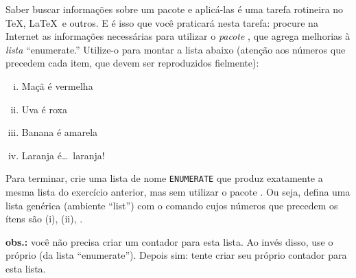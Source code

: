 \documentclass[a4paper,10pt,twocolumn,landscape]{article}
\begin{document}
	\begin{exercicio}
	Saber buscar informações sobre um pacote e aplicá-las é uma tarefa rotineira
	no \TeX, \LaTeX\ e outros. E é isso que você praticará nesta tarefa: procure 
	na Internet as informações necessárias para utilizar o \emph{pacote}
	, que agrega melhorias à \emph{lista} ``enumerate.'' 
	Utilize-o para montar a lista abaixo (atenção aos números que precedem cada
	item, que devem ser reproduzidos fielmente):
	
	\begin{enumerate}[(i)] %
		\item Maçã é vermelha
		\item Uva é roxa
		\item Banana é amarela
		\item Laranja é\dots\ laranja!
	\end{enumerate}	
	\end{exercicio}

	\begin{exercicio}
	Para terminar, crie uma lista de nome \texttt{ENUMERATE} que produz 	
	exatamente a mesma lista do exercício anterior, mas sem utilizar o pacote
	. Ou seja, defina uma lista genérica (ambiente ``list'') 
	com o comando  cujos números que precedem os ítens são
	(i), (ii), \etc.
	
	\textbf{obs.:} você não precisa criar um contador para esta lista. Ao invés
	disso, use o próprio  (da lista ``enumerate''). Depois sim:
	tente criar seu próprio contador para esta lista.
	\end{exercicio}
%
	 
		
\end{document}
